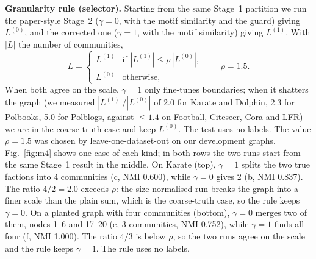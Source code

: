 \documentclass[conference]{IEEEtran}
\begin{document}
\textbf{Granularity rule (selector).} Starting from the same Stage~1 partition we run the paper-style Stage~2 ($\gamma=0$, with the motif similarity and the guard) giving $L^{(0)}$, and the corrected one ($\gamma=1$, with the motif similarity) giving $L^{(1)}$. With $|L|$ the number of communities,
\begin{equation}
L=\begin{cases}L^{(1)}&\text{if }|L^{(1)}|\le\rho\,|L^{(0)}|,\\ L^{(0)}&\text{otherwise,}\end{cases}\qquad\rho=1.5.\label{eq:gran}
\end{equation}
When both agree on the scale, $\gamma=1$ only fine-tunes boundaries; when it shatters the graph (we measured $|L^{(1)}|/|L^{(0)}|$ of 2.0 for Karate and Dolphin, 2.3 for Polbooks, 5.0 for Polblogs, against $\le1.4$ on Football, Citeseer, Cora and LFR) we are in the coarse-truth case and keep $L^{(0)}$. The test uses no labels. The value $\rho=1.5$ was chosen by leave-one-dataset-out on our development graphs. Fig.~\ref{fig:m4} shows one case of each kind; in both rows the two runs start from the same Stage~1 result in the middle. On Karate (top), $\gamma=1$ splits the two true factions into 4 communities (c, NMI 0.600), while $\gamma=0$ gives 2 (b, NMI 0.837). The ratio $4/2=2.0$ exceeds $\rho$: the size-normalised run breaks the graph into a finer scale than the plain sum, which is the coarse-truth case, so the rule keeps $\gamma=0$. On a planted graph with four communities (bottom), $\gamma=0$ merges two of them, nodes 1--6 and 17--20 (e, 3 communities, NMI 0.752), while $\gamma=1$ finds all four (f, NMI 1.000). The ratio $4/3$ is below $\rho$, so the two runs agree on the scale and the rule keeps $\gamma=1$. The rule uses no labels.
\end{document}
